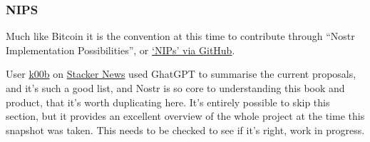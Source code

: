\subsubsection{NIPS}
Much like Bitcoin it is the convention at this time to contribute through ``Nostr Implementation Possibilities'', or \href{https://github.com/nostr-protocol/nips}{`NIPs' via GitHub}. \par
User \href{https://stacker.news/k00b}{k00b} on \href{https://stacker.news/items/119948}{Stacker News} used GhatGPT to summarise the current proposals, and it's such a good list, and Nostr is so core to understanding this book and product, that it's worth duplicating here. It's entirely possible to skip this section, but it provides an excellent overview of the whole project at the time this snapshot was taken. This needs to be checked to see if it's right, work in progress. 


